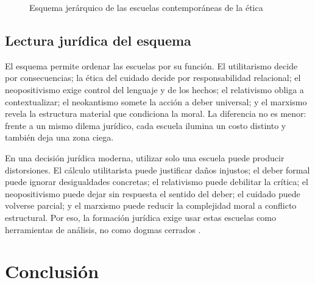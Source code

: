 \documentclass[
	spanish, %
	letterpaper, oneside
]{article}
\begin{document}
\begin{landscape}
\begin{figure}[H]
{}
\caption{Esquema jerárquico de las escuelas contemporáneas de la ética}
\label{fig:esquema-escuelas-eticas}
\end{figure}
\end{landscape}
\pagestyle{fancy}

\subsection{Lectura jurídica del esquema}

El esquema permite ordenar las escuelas por su función. El utilitarismo decide por consecuencias; la ética del cuidado decide por responsabilidad relacional; el neopositivismo exige control del lenguaje y de los hechos; el relativismo obliga a contextualizar; el neokantismo somete la acción a deber universal; y el marxismo revela la estructura material que condiciona la moral. La diferencia no es menor: frente a un mismo dilema jurídico, cada escuela ilumina un costo distinto y también deja una zona ciega.

En una decisión jurídica moderna, utilizar solo una escuela puede producir distorsiones. El cálculo utilitarista puede justificar daños injustos; el deber formal puede ignorar desigualdades concretas; el relativismo puede debilitar la crítica; el neopositivismo puede dejar sin respuesta el sentido del deber; el cuidado puede volverse parcial; y el marxismo puede reducir la complejidad moral a conflicto estructural. Por eso, la formación jurídica exige usar estas escuelas como herramientas de análisis, no como dogmas cerrados \citep{ronquilloarmasEticaGeneralProfesional2018,singerCompendioEtica1995}.

\section{Conclusión}
\end{document}
